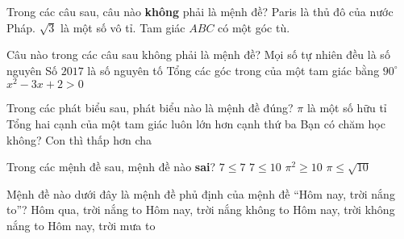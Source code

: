 \begin{ex}%
	Trong các câu sau, câu nào \textbf{không} phải là mệnh đề?
	\def\dotEX{}
	{Paris là thủ đô của nước Pháp.}
	{$\sqrt{3}$ là một số vô tỉ.}
	{Tam giác $ABC$ có một góc tù.}
\end{ex}

\begin{ex}%
	Câu nào trong các câu sau không phải là mệnh đề?
	\choice 
	{Mọi số tự nhiên đều là số nguyên}
	{ Số $2017$ là số nguyên tố}
	{  Tổng các góc trong của một tam giác bằng $90^\circ$}
	{ \True $x^2-3x+2>0$}
\end{ex} 
\begin{ex}%
	Trong các phát biểu sau, phát biểu nào là mệnh đề đúng?
	\choice 
	{ $\pi $ là một số hữu tỉ} 
	{ \True Tổng hai cạnh của một tam giác luôn lớn hơn cạnh thứ ba} 
	{ Bạn có chăm học không?} 
	{ Con thì thấp hơn cha} 
\end{ex}

\begin{ex}%
	Trong các mệnh đề sau, mệnh đề nào \textbf{sai}?
	\choice
	{$7 \le 7$}
	{$7 \le 10$}
	{\True $\pi^2 \ge 10$}
	{$\pi \le \sqrt{10}$} 
\end{ex}
\begin{ex}%
	Mệnh đề nào dưới đây là mệnh đề phủ định của mệnh đề “Hôm nay, trời nắng to”?
	\choice
	{Hôm qua, trời nắng to}
	{Hôm nay, trời nắng không to}
	{\True Hôm nay, trời không nắng to}
	{Hôm nay, trời mưa to}
\end{ex}

